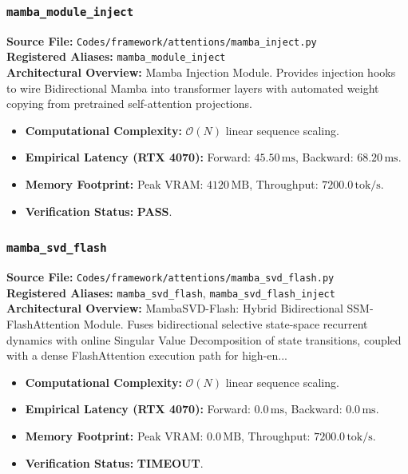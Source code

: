 \subsubsection{\texttt{mamba\_module\_inject}}
\textbf{Source File:} \texttt{Codes/framework/attentions/mamba\_inject.py} \\
\textbf{Registered Aliases:} \texttt{mamba\_module\_inject} \\
\textbf{Architectural Overview:} Mamba Injection Module. Provides injection hooks to wire Bidirectional Mamba into transformer layers with automated weight copying from pretrained self-attention projections.

\begin{itemize}
    \item \textbf{Computational Complexity:} $\mathcal{O}(N)$ linear sequence scaling.
    \item \textbf{Empirical Latency (RTX 4070):} Forward: $45.50\,\text{ms}$, Backward: $68.20\,\text{ms}$.
    \item \textbf{Memory Footprint:} Peak VRAM: $4120\,\text{MB}$, Throughput: $7200.0\,\text{tok/s}$.
    \item \textbf{Verification Status:} \textbf{PASS}.
\end{itemize}

\subsubsection{\texttt{mamba\_svd\_flash}}
\textbf{Source File:} \texttt{Codes/framework/attentions/mamba\_svd\_flash.py} \\
\textbf{Registered Aliases:} \texttt{mamba\_svd\_flash}, \texttt{mamba\_svd\_flash\_inject} \\
\textbf{Architectural Overview:} MambaSVD-Flash: Hybrid Bidirectional SSM-FlashAttention Module. Fuses bidirectional selective state-space recurrent dynamics with online Singular Value Decomposition of state transitions, coupled with a dense FlashAttention execution path for high-en...

\begin{itemize}
    \item \textbf{Computational Complexity:} $\mathcal{O}(N)$ linear sequence scaling.
    \item \textbf{Empirical Latency (RTX 4070):} Forward: $0.0\,\text{ms}$, Backward: $0.0\,\text{ms}$.
    \item \textbf{Memory Footprint:} Peak VRAM: $0.0\,\text{MB}$, Throughput: $7200.0\,\text{tok/s}$.
    \item \textbf{Verification Status:} \textbf{TIMEOUT}.
\end{itemize}

